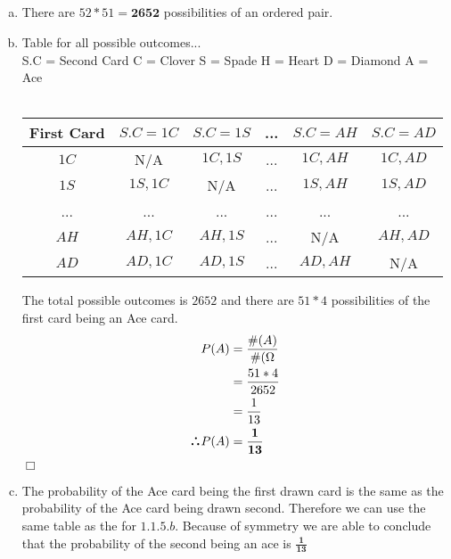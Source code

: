 \documentclass[10pt]{report}
\newenvironment{proof}{\par\noindent{\it Proof.}\hspace*{1em}}{$\Box$\bigskip}
\def\therefore{\boldsymbol{\text{ }
\leavevmode
\lower0.4ex\hbox{$\cdot$}
\kern-.5em\raise0.7ex\hbox{$\cdot$}
\kern-0.6em\lower0.4ex\hbox{$\cdot$}
\thinspace\text{ }}}
\begin{document}
\subsection{}
 \begin{enumerate}[(a)]
 \item There are $52 * 51 = \mathbf{2652} $ possibilities of an ordered pair.
 \item \begin{proof}
 \begin{center}
 Table for all possible outcomes... \\
 \footnotesize{ S.C = Second Card }
 \footnotesize{ C = Clover }
 \footnotesize{ S = Spade}
 \footnotesize{ H = Heart}
 \footnotesize{ D = Diamond} 
 \footnotesize{ A = Ace } \\ 
 \ \\
 \begin{tabular}{ |c|c|c|c|c|c| }
 \hline
First Card &  $S.C = 1C$ & $S.C = 1S$ & ... & $S.C = AH$ & $S.C = AD$ \\
\hline
$1C$ & N/A & $1C, 1S$ & ... & $1C, AH$ & $1C, AD$  \\
\hline
$1S$ & $1S, 1C $ & N/A & ... & $1S, AH$ & $1S, AD $ \\
\hline
... & ... & ... & ... & ... & ... \\
\hline
$AH$ & $AH, 1C$ & $AH, 1S$ & ... & N/A & $AH, AD $ \\
\hline
$AD$ & $AD, 1C$ & $AD, 1S$ & ... & $AD, AH$ & N/A \\
\hline
 \end{tabular}
 \end{center}
 The total possible outcomes is $2652 $ and there are $51 * 4 $ possibilities of the first card being an Ace card. \\
     \begin{align*}
 P(A) &= \frac{\#(A)}{\#(\Omega} \\
 &= \frac{51*4}{2652} \\
 & = \frac{1}{13} \\
 \therefore  P(A) &= \mathbf{\frac{1}{13}}
 \end{align*} 
 \end{proof}
 \item The probability of the Ace card being the first drawn card is the same as the probability of the Ace card being drawn second. Therefore we can use the same table as the for $1.1.5.b $. Because of symmetry we are able to conclude that the probability of the second being an ace is $\mathbf{\frac{1}{13}} $ \\

\end{enumerate}
\end{document}

